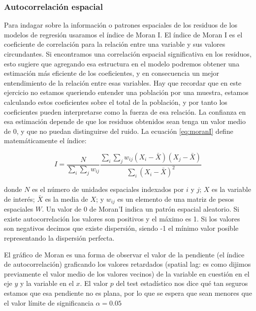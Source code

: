 \documentclass[12pt,]{book}
\begin{document}
\subsubsection{Autocorrelación espacial}\label{autocorrelacion-espacial}

Para indagar sobre la información o patrones espaciales de los residuos
de los modelos de regresión usaramos el índice de Moran I. El índice de
Moran I es el coeficiente de correlación para la relación entre una
variable y sus valores circundantes. Si encontramos una correlación
espacial significativa en los residuos, esto sugiere que agregando esa
estructura en el modelo podremos obtener una estimación más eficiente de
los coeficientes, y en consecuencia un mejor entendimiento de la
relación entre esas variables. Hay que recordar que en este ejercicio no
estamos queriendo entender una población por una muestra, estamos
calculando estos coeficientes sobre el total de la población, y por
tanto los coeficientes pueden interpretarse como la fuerza de esa
relación. La confianza en esa estimación depende de que los residuos
obtenidos sean tenga un valor medio de 0, y que no puedan distinguirse
del ruido. La ecuación \eqref{eq:moranI} define matemáticamente el índice:

\begin{equation}
 I=\frac {N}{\sum _{i}\sum _{j}w_{ij}} \frac {\sum _{i}\sum _{j}w_{ij}(X_{i}-{\bar {X}})(X_{j}-{\bar {X}})}{\sum _{i}(X_{i}- \bar{X})^{2}}
\label{eq:moranI}
\end{equation}

donde \(N\) es el número de unidades espaciales indexados por \(i\) y
\(j\); \(X\) es la variable de interés; \(\bar {X}\) es la media de
\(X\); y \(w_{ij}\) es un elemento de una matriz de pesos espaciales
\(W\). Un valor de 0 de Moran'I indica un patrón espacial aleatorio. Si
existe autocorrelación los valores son positivos y el máximo es 1. Si
los valores son negativos decimos que existe dispersión, siendo -1 el
mínimo valor posible representando la dispersión perfecta.

El gráfico de Moran es una forma de observar el valor de la pendiente
(el índice de autocorrelación) graficando los valores retardados
(spatial lag: es como dijimos previamente el valor medio de los valores
vecinos) de la variable en cuestión en el eje \(y\) y la variable en el
\(x\). El valor \textbf{\(p\)} del test estadístico nos dice qué tan
seguros estamos que esa pendiente no es plana, por lo que se espera que
sean menores que el valor límite de significancia \(\alpha = 0.05\)
\end{document}
